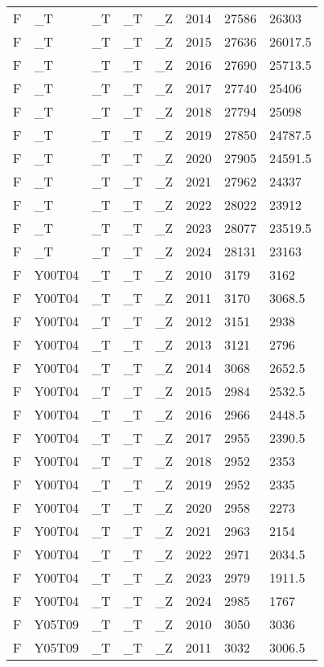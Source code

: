 \begin{longtable}[t]{llllllll}
F & \_T & \_T & \_T & \_Z & 2014 & 27586 & 26303\\
\addlinespace
F & \_T & \_T & \_T & \_Z & 2015 & 27636 & 26017.5\\
F & \_T & \_T & \_T & \_Z & 2016 & 27690 & 25713.5\\
F & \_T & \_T & \_T & \_Z & 2017 & 27740 & 25406\\
F & \_T & \_T & \_T & \_Z & 2018 & 27794 & 25098\\
F & \_T & \_T & \_T & \_Z & 2019 & 27850 & 24787.5\\
\addlinespace
F & \_T & \_T & \_T & \_Z & 2020 & 27905 & 24591.5\\
F & \_T & \_T & \_T & \_Z & 2021 & 27962 & 24337\\
F & \_T & \_T & \_T & \_Z & 2022 & 28022 & 23912\\
F & \_T & \_T & \_T & \_Z & 2023 & 28077 & 23519.5\\
F & \_T & \_T & \_T & \_Z & 2024 & 28131 & 23163\\
\addlinespace
F & Y00T04 & \_T & \_T & \_Z & 2010 & 3179 & 3162\\
F & Y00T04 & \_T & \_T & \_Z & 2011 & 3170 & 3068.5\\
F & Y00T04 & \_T & \_T & \_Z & 2012 & 3151 & 2938\\
F & Y00T04 & \_T & \_T & \_Z & 2013 & 3121 & 2796\\
F & Y00T04 & \_T & \_T & \_Z & 2014 & 3068 & 2652.5\\
\addlinespace
F & Y00T04 & \_T & \_T & \_Z & 2015 & 2984 & 2532.5\\
F & Y00T04 & \_T & \_T & \_Z & 2016 & 2966 & 2448.5\\
F & Y00T04 & \_T & \_T & \_Z & 2017 & 2955 & 2390.5\\
F & Y00T04 & \_T & \_T & \_Z & 2018 & 2952 & 2353\\
F & Y00T04 & \_T & \_T & \_Z & 2019 & 2952 & 2335\\
\addlinespace
F & Y00T04 & \_T & \_T & \_Z & 2020 & 2958 & 2273\\
F & Y00T04 & \_T & \_T & \_Z & 2021 & 2963 & 2154\\
F & Y00T04 & \_T & \_T & \_Z & 2022 & 2971 & 2034.5\\
F & Y00T04 & \_T & \_T & \_Z & 2023 & 2979 & 1911.5\\
F & Y00T04 & \_T & \_T & \_Z & 2024 & 2985 & 1767\\
\addlinespace
F & Y05T09 & \_T & \_T & \_Z & 2010 & 3050 & 3036\\
F & Y05T09 & \_T & \_T & \_Z & 2011 & 3032 & 3006.5\\

\end{longtable}
